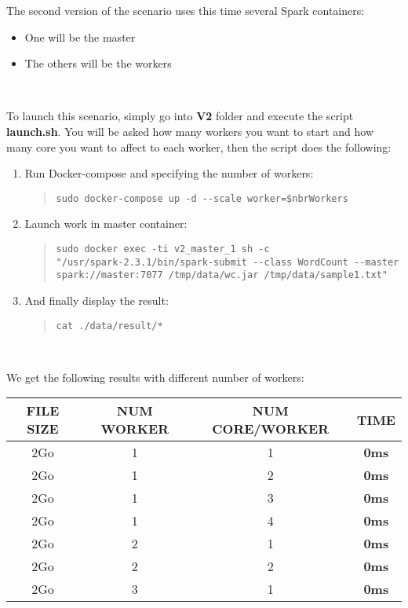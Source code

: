 \documentclass{article}
\begin{document}
The second version of the scenario uses this time several Spark containers:
\begin{itemize}
  \item One will be the master
  \item The others will be the workers
\end{itemize}
\ \

\noindent To launch this scenario, simply go into \textbf{V2} folder and execute the script \textbf{launch.sh}. You will be asked how many workers you want to start and how many core you want to affect to each worker, then the script does the following:
\begin{enumerate}
    \item Run Docker-compose and specifying the number of workers:
    \begin{quote}
\begin{verbatim}
sudo docker-compose up -d --scale worker=$nbrWorkers
\end{verbatim}
    \end{quote}
    
    \item Launch work in master container:
    \begin{quote}
\begin{verbatim}
sudo docker exec -ti v2_master_1 sh -c 
"/usr/spark-2.3.1/bin/spark-submit --class WordCount --master 
spark://master:7077 /tmp/data/wc.jar /tmp/data/sample1.txt"
\end{verbatim}
    \end{quote}
    
    \item And finally display the result:
    \begin{quote}
\begin{verbatim}
cat ./data/result/*
\end{verbatim}
    \end{quote}
\end{enumerate}
\ \

\noindent We get the following results with different number of workers: \\
\begin{center}
    \begin{tabular}{||c c c c||} 
    \hline
    FILE SIZE & NUM WORKER & NUM CORE/WORKER & TIME \\ [0.5ex] 
    \hline\hline
    2Go & 1 & 1 & \textbf{0ms} \\ 
    \hline
    2Go & 1 & 2 & \textbf{0ms} \\ 
    \hline
    2Go & 1 & 3 & \textbf{0ms} \\ 
    \hline
    2Go & 1 & 4 & \textbf{0ms} \\ 
    \hline
    2Go & 2 & 1 & \textbf{0ms} \\ 
    \hline
    2Go & 2 & 2 & \textbf{0ms} \\ 
    \hline
    2Go & 3 & 1 & \textbf{0ms} \\ 
    \hline
    \end{tabular}
\end{center}
\vspace*{0.2cm}
\end{document}
